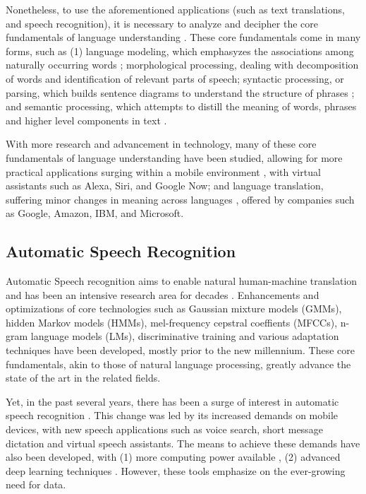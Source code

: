 Nonetheless, to use the aforementioned applications (such as text translations, and speech recognition), it is necessary to analyze and decipher the core fundamentals of language understanding \cite{otter2020survey}. These core fundamentals come in many forms, such as (1) language modeling, which emphasyzes the associations among naturally occurring words \cite{DBLP:journals/corr/cs-CL-0108005}; morphological processing, dealing with decomposition of words and identification of relevant parts of speech; syntactic processing, or parsing, which builds sentence diagrams to understand the structure of phrases \cite{woolf2010building}; and semantic processing, which attempts to distill the meaning of words, phrases and higher level components in text \cite{otter2020survey}.

With more research and advancement in technology, many of these core fundamentals of language understanding have been studied, allowing for more practical applications surging within a mobile environment \cite{yu2016automatic}, with virtual assistants such as Alexa, Siri, and Google Now; and language translation, suffering minor changes in meaning across languages \cite{de2018no}, offered by companies such as Google, Amazon, IBM, and Microsoft.

\subsection{Automatic Speech Recognition}

Automatic Speech recognition aims to enable natural human-machine translation and has been an intensive research area for decades \cite{yu2016automatic}. Enhancements and optimizations of core technologies such as Gaussian mixture models (GMMs), hidden Markov models (HMMs), mel-frequency cepstral coeffients (MFCCs), n-gram language models (LMs), discriminative training and various adaptation techniques have been developed, mostly prior to the new millennium. These core fundamentals, akin to those of natural language processing, greatly advance the state of the art in the related fields.

Yet, in the past several years, there has been a surge of interest in automatic speech recognition \cite{jurafsky2016speech}. This change was led by its increased demands on mobile devices, with new speech applications such as voice search, short message dictation and virtual speech assistants. The means to achieve these demands have also been developed, with (1) more computing power available \cite{ECONOMOU2004279}, (2) advanced deep learning techniques \cite{graves2013speech}. However, these tools emphasize on the ever-growing need for data.


